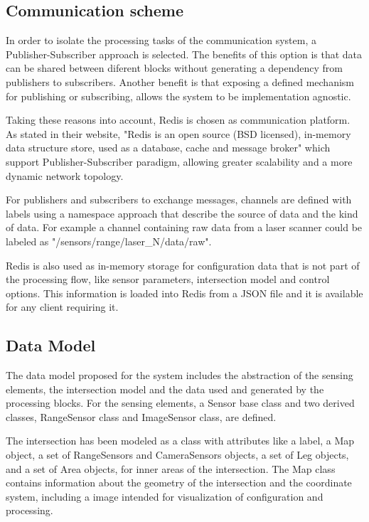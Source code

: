 \subsection{Communication scheme}

In order to isolate the processing tasks of the communication system, a Publisher-Subscriber approach is selected. The benefits of this option is that data can be shared between diferent blocks without generating a dependency from publishers to subscribers. Another benefit is that exposing a defined mechanism for publishing or subscribing, allows the system to be implementation agnostic.

Taking these reasons into account, Redis is chosen as communication platform. As stated in their website, "Redis is an open source (BSD licensed), in-memory data structure store, used as a database, cache and message broker"\cite{Redis} which support Publisher-Subscriber paradigm, allowing greater scalability and a more dynamic network topology.

For publishers and subscribers to exchange messages, channels are defined with labels using a namespace approach that describe the source of data and the kind of data. For example a channel containing raw data from a laser scanner could be labeled as "/sensors/range/laser\_N/data/raw".

Redis is also used as in-memory storage for configuration data that is not part of the processing flow, like sensor parameters, intersection model and control options. This information is loaded into Redis from a JSON file and it is available for any client requiring it.


\subsection{Data Model}

The data model proposed for the system includes the abstraction of the sensing elements, the intersection model and the data used and generated by the processing blocks. For the sensing elements, a Sensor base class and two derived classes, RangeSensor class and ImageSensor class, are defined. 

The intersection has been modeled as a class with attributes like a label, a Map object, a set of RangeSensors and CameraSensors objects, a set of Leg objects, and a set of Area objects, for inner areas of the intersection. The Map class contains information about the geometry of the intersection and the coordinate system, including a image intended for visualization of configuration and processing.

